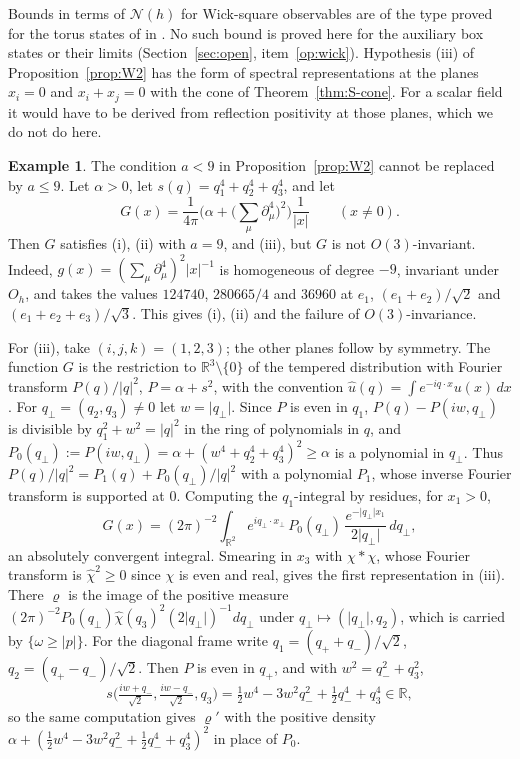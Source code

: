 \documentclass[11pt]{amsart}
\theoremstyle{plain}
\theoremstyle{definition}
\newtheorem{example}[theorem]{Example}
\theoremstyle{remark}
\numberwithin{equation}{section}
\newcommand{\R}{\mathbb{R}}
\newcommand{\Oh}{O_h}
\newcommand{\abs}[1]{\lvert #1\rvert}
\begin{document}
Bounds in terms of $\mathcal N(h)$ for Wick-square observables are of the type proved for the torus states of \cite{v1} in \cite[Thm.~3.1(iii)]{v1}. No such bound is proved here for the auxiliary box states or their limits (Section~\ref{sec:open}, item~\ref{op:wick}). Hypothesis (iii) of Proposition~\ref{prop:W2} has the form of spectral representations at the planes $x_i=0$ and $x_i+x_j=0$ with the cone of Theorem~\ref{thm:S-cone}. For a scalar field it would have to be derived from reflection positivity at those planes, which we do not do here.

\begin{example}\label{ex:sharp}
The condition $a<9$ in Proposition~\ref{prop:W2} cannot be replaced by $a\le9$. Let $\alpha>0$, let $s(q)=q_1^4+q_2^4+q_3^4$, and let
\[
G(x)=\frac1{4\pi}\Big(\alpha+\big(\textstyle\sum_\mu\partial_\mu^4\big)^2\Big)\frac1{\abs x}\qquad(x\ne0).
\]
Then $G$ satisfies (i), (ii) with $a=9$, and (iii), but $G$ is not $O(3)$-invariant. Indeed, $g(x)=(\sum_\mu\partial_\mu^4)^2\abs x^{-1}$ is homogeneous of degree $-9$, invariant under $\Oh$, and takes the values $124740$, $280665/4$ and $36960$ at $e_1$, $(e_1+e_2)/\sqrt2$ and $(e_1+e_2+e_3)/\sqrt3$. This gives (i), (ii) and the failure of $O(3)$-invariance.

For (iii), take $(i,j,k)=(1,2,3)$; the other planes follow by symmetry. The function $G$ is the restriction to $\R^3\setminus\{0\}$ of the tempered distribution with Fourier transform $P(q)/\abs q^2$, $P=\alpha+s^2$, with the convention $\hat u(q)=\int e^{-iq\cdot x}u(x)\,dx$. For $q_\perp=(q_2,q_3)\ne0$ let $w=\abs{q_\perp}$. Since $P$ is even in $q_1$, $P(q)-P(iw,q_\perp)$ is divisible by $q_1^2+w^2=\abs q^2$ in the ring of polynomials in $q$, and $P_0(q_\perp):=P(iw,q_\perp)=\alpha+(w^4+q_2^4+q_3^4)^2\ge\alpha$ is a polynomial in $q_\perp$. Thus $P(q)/\abs q^2=P_1(q)+P_0(q_\perp)/\abs q^2$ with a polynomial $P_1$, whose inverse Fourier transform is supported at $0$. Computing the $q_1$-integral by residues, for $x_1>0$,
\[
G(x)=(2\pi)^{-2}\int_{\R^2}e^{iq_\perp\cdot x_\perp}\,P_0(q_\perp)\,\frac{e^{-\abs{q_\perp}x_1}}{2\abs{q_\perp}}\,dq_\perp ,
\]
an absolutely convergent integral. Smearing in $x_3$ with $\chi*\chi$, whose Fourier transform is $\hat\chi^2\ge0$ since $\chi$ is even and real, gives the first representation in (iii). There $\varrho$ is the image of the positive measure $(2\pi)^{-2}P_0(q_\perp)\hat\chi(q_3)^2(2\abs{q_\perp})^{-1}dq_\perp$ under $q_\perp\mapsto(\abs{q_\perp},q_2)$, which is carried by $\{\omega\ge\abs p\}$. For the diagonal frame write $q_1=(q_++q_-)/\sqrt2$, $q_2=(q_+-q_-)/\sqrt2$. Then $P$ is even in $q_+$, and with $w^2=q_-^2+q_3^2$,
\[
s\big(\tfrac{iw+q_-}{\sqrt2},\tfrac{iw-q_-}{\sqrt2},q_3\big)=\tfrac12w^4-3w^2q_-^2+\tfrac12q_-^4+q_3^4\in\R ,
\]
so the same computation gives $\varrho'$ with the positive density $\alpha+(\frac12w^4-3w^2q_-^2+\frac12q_-^4+q_3^4)^2$ in place of $P_0$.
\end{example}
\end{document}
